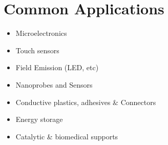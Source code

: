 \documentclass[12pt,english]{article}
\begin{document}
\newpage
\section*{Common Applications}
\begin{itemize}
    \item Microelectronics
    \item Touch sensors
    \item Field Emission (LED, etc)
    \item Nanoprobes and Sensors
    \item Conductive plastics, adhesives \& Connectors
    \item Energy storage
    \item Catalytic \& biomedical supports
\end{itemize}










% 
\end{document}
